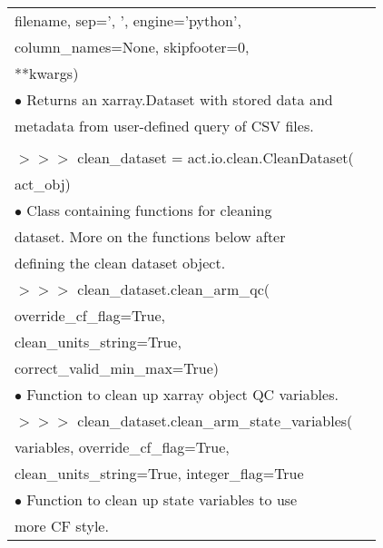 \documentclass[potrait, z1paper, fontscale=0.33]{baposter} %
\begin{document}
\begin{poster}
{\begin{flushleft}
\begin{tabular}{@{}ll@{}}
\-\hspace{1.2cm} filename, sep=', ', engine='python',\\
\-\hspace{1.2cm} column\_names=None, skipfooter=0,\\
\-\hspace{1.2cm} **kwargs)\\
\-\hspace{0.2cm} $\bullet$ Returns an xarray.Dataset with stored data and\\
\-\hspace{0.5cm} metadata from user-defined query of CSV files.\\
\\
$>$$>$$>$ clean\_dataset = act.io.clean.CleanDataset(\\
\-\hspace{1.2cm} act\_obj)\\
\-\hspace{0.2cm} $\bullet$ Class containing functions for cleaning\\
\-\hspace{0.5cm} dataset. More on the functions below after\\
\-\hspace{0.5cm} defining the clean dataset object.\\
$>$$>$$>$ clean\_dataset.clean\_arm\_qc(\\
\-\hspace{1.2cm} override\_cf\_flag=True,\\
\-\hspace{1.2cm} clean\_units\_string=True,\\
\-\hspace{1.2cm} correct\_valid\_min\_max=True)\\
\-\hspace{0.2cm} $\bullet$ Function to clean up xarray object QC variables.\\
$>$$>$$>$ clean\_dataset.clean\_arm\_state\_variables(\\
\-\hspace{1.2cm} variables, override\_cf\_flag=True,\\
\-\hspace{1.2cm} clean\_units\_string=True, integer\_flag=True\\
\-\hspace{0.2cm} $\bullet$ Function to clean up state variables to use\\
\-\hspace{0.5cm} more CF style.\\

\end{tabular}
\end{flushleft}}
\end{poster}
\end{document}
